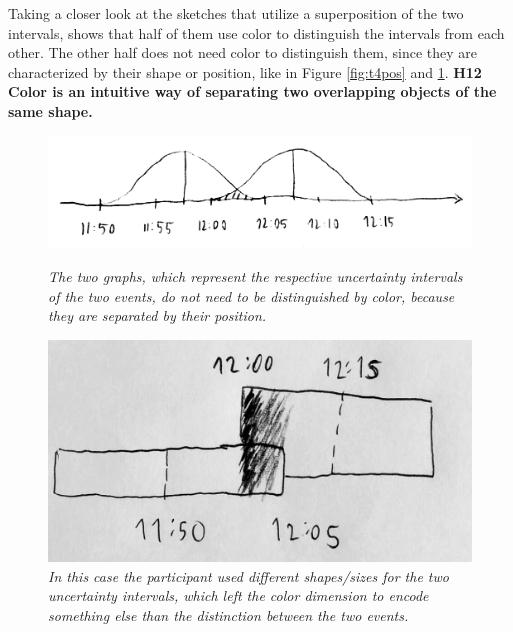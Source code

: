 Taking a closer look at the sketches that utilize a superposition of the two intervals, shows that half of them use color to distinguish the intervals from each other. The other half does not need color to distinguish them, since they are characterized by their shape or position, like in Figure \ref{fig:t4pos} and \ref{fig:t4shape}. \textbf{H12 Color is an intuitive way of separating two overlapping objects of the same shape.}\par \medskip

\begin{figure}[H]
	\begin{minipage}{.5\textwidth}
		\centering
		\captionsetup{width=0.8\textwidth}
		\includegraphics[height=0.28\textwidth]{figures/t4pos.png}
		\caption{\textit{The two graphs, which represent the respective uncertainty intervals of the two events, do not need to be distinguished by color, because they are separated by their position.}}
		\label{fig:t4pos}
	\end{minipage}
	\begin{minipage}{.5\textwidth}
		\centering
		\captionsetup{width=1.0\textwidth}
		\includegraphics[height=0.45\textwidth]{figures/t4shape.jpg}
		\caption{\textit{In this case the participant used different shapes/sizes for the two uncertainty intervals, which left the color dimension to encode something else than the distinction between the two events.}}
		\label{fig:t4shape}
	\end{minipage}
\end{figure}
